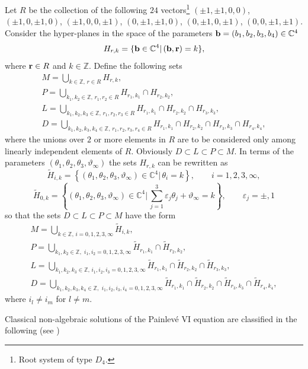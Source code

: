 \documentclass[12pt]{article}
\def\thi{{\vartheta_\infty}}
\def\eps{\varepsilon}
\newcommand{\complessi}{\mathbb C}
\newcommand {\interi}{\mathbb Z}
\theoremstyle{definition}
\theoremstyle{theorem}
\begin{document}
Let $R$ be the collection of the following $24$ vectors\footnote{Root
system of type $D_4$.}
$(\pm1,\pm1,0,0)$, $(\pm1,0,\pm1,0)$, $(\pm1,0,0,\pm1)$,
$(0,\pm1,\pm1,0)$, $(0,\pm1,0,\pm1)$, $(0,0,\pm1,\pm1)$. 
Consider the hyper-planes in the space of the parameters 
${\bf b}=(b_1,b_2, b_3, b_4)\in\complessi^4$ 
$$
H_{r,k}=\{{\bf b}\in\complessi^4|\, ({\bf b},{\bf r})=k\},
$$
where ${\bf r}\in R$ and $k\in\interi$. Define the following sets
$$
\begin{array}{c}
M= \bigcup_{k\in\interi,\, r\in R}H_{r,k},\\
P= \bigcup_{k_1,k_2\in\interi,\, r_1,r_2\in R}
H_{r_1,k_1}\cap H_{r_2,k_2},\\
L= \bigcup_{k_1,k_2,k_3\in\interi,\, r_1,r_2,r_3\in R}
H_{r_1,k_1}\cap H_{r_2,k_2}\cap H_{r_3,k_3},\\
D=\bigcup_{k_1,k_2,k_3,k_4\in\interi,\, r_1,r_2,r_3,r_4\in R}
H_{r_1,k_1}\cap H_{r_2,k_2}\cap H_{r_3,k_3}\cap H_{r_4,k_4},
\end{array}
$$
where the unions over $2$ or more elements in $R$ are to be considered
only among linearly independent elements of $R$. Obviously 
$D\subset L\subset P\subset M$. In terms of the parameters 
$(\theta_1,\theta_2,\theta_3,\thi)$ the sets $H_{r,k}$ can be
rewritten as 
$$
\tilde H_{i,k}=\left\{(\theta_1,\theta_2,\theta_3,\thi)
\in\complessi^4|\, \theta_i=k\right\}, \qquad i=1,2,3,\infty,
$$
$$
\tilde H_{0,k}=\left\{(\theta_1,\theta_2,\theta_3,\thi)
\in\complessi^4|\,\sum_{j=1}^3\eps_j\theta_j+\thi=k\right\}, 
\qquad \eps_j=\pm,1
$$
so that the sets $D\subset L\subset P\subset M$ have the form
$$
\begin{array}{c}
M= \bigcup_{k\in\interi,\, i=0,1,2,3,\infty}\tilde H_{i,k},\\
P= \bigcup_{k_1,k_2\in\interi,\,\, i_1,i_2=0,1,2,3,\infty}
\tilde H_{r_1,k_1}\cap\tilde H_{r_2,k_2},\\
L= \bigcup_{k_1,k_2,k_3\in\interi,\,i_1,i_2,i_3 =0,1,2,3,\infty}
\tilde H_{r_1,k_1}\cap\tilde H_{r_2,k_2}\cap\tilde H_{r_3,k_3},\\
D=\bigcup_{k_1,k_2,k_3,k_4\in\interi,\,
\,i_1,i_2,i_3,i_4 =0,1,2,3,\infty}
\tilde H_{r_1,k_1}\cap\tilde H_{r_2,k_2}\cap\tilde H_{r_3,k_3}
\cap\tilde H_{r_4,k_4},
\end{array}
$$
where $i_l\neq i_m$ for $l\neq m$.

Classical non-algebraic solutions of the Painlev\'e VI equation are 
classified in the following (see \cite{Wat})
\end{document}
